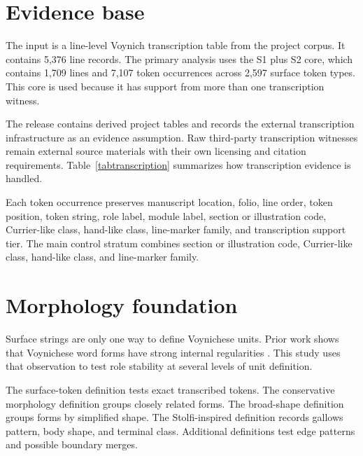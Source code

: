 \documentclass[11pt]{article}
\begin{document}
\section{Evidence base}

The input is a line-level Voynich transcription table from the project corpus. It contains 5,376 line records. The primary analysis uses the S1 plus S2 core, which contains 1,709 lines and 7,107 token occurrences across 2,597 surface token types. This core is used because it has support from more than one transcription witness.

The release contains derived project tables and records the external transcription infrastructure as an evidence assumption. Raw third-party transcription witnesses remain external source materials with their own licensing and citation requirements. Table~\ref{tabtranscription} summarizes how transcription evidence is handled.

\begin{table}[H]
\centering
\caption{Transcription assumptions}
\label{tabtranscription}
\resizebox{\linewidth}{!}{}
\end{table}

Each token occurrence preserves manuscript location, folio, line order, token position, token string, role label, module label, section or illustration code, Currier-like class, hand-like class, line-marker family, and transcription support tier. The main control stratum combines section or illustration code, Currier-like class, hand-like class, and line-marker family.

\section{Morphology foundation}

Surface strings are only one way to define Voynichese units. Prior work shows that Voynichese word forms have strong internal regularities \cite{stolfi_word_grammar_2000}. This study uses that observation to test role stability at several levels of unit definition.

The surface-token definition tests exact transcribed tokens. The conservative morphology definition groups closely related forms. The broad-shape definition groups forms by simplified shape. The Stolfi-inspired definition records gallows pattern, body shape, and terminal class. Additional definitions test edge patterns and possible boundary merges.
\end{document}
